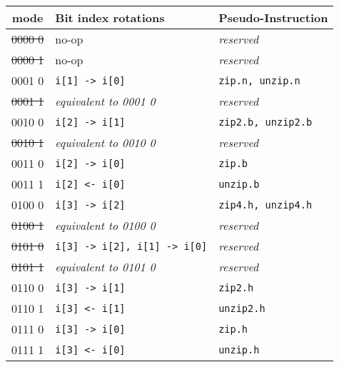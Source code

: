 \begin{table}[h]
\begin{small}
\begin{center}
\begin{tabular}{c l l}
      mode    & Bit index rotations              & Pseudo-Instruction     \\

\hline

\sout{0000 0} & no-op                            & {\it reserved}         \\
\sout{0000 1} & no-op                            & {\it reserved}         \\
      0001 0  & {\tt i[1] -> i[0]}               & {\tt zip.n, unzip.n}   \\
\sout{0001 1} & {\it equivalent to 0001 0}       & {\it reserved}         \\
      0010 0  & {\tt i[2] -> i[1]}               & {\tt zip2.b, unzip2.b} \\
\sout{0010 1} & {\it equivalent to 0010 0}       & {\it reserved}         \\
      0011 0  & {\tt i[2] -> i[0]}               & {\tt zip.b}            \\
      0011 1  & {\tt i[2] <- i[0]}               & {\tt unzip.b}          \\

\hline

      0100 0  & {\tt i[3] -> i[2]}               & {\tt zip4.h, unzip4.h} \\
\sout{0100 1} & {\it equivalent to 0100 0}       & {\it reserved}         \\
\sout{0101 0} & {\tt i[3] -> i[2], i[1] -> i[0]} & {\it reserved}         \\
\sout{0101 1} & {\it equivalent to 0101 0}       & {\it reserved}         \\
      0110 0  & {\tt i[3] -> i[1]}               & {\tt zip2.h}           \\
      0110 1  & {\tt i[3] <- i[1]}               & {\tt unzip2.h}         \\
      0111 0  & {\tt i[3] -> i[0]}               & {\tt zip.h}            \\
      0111 1  & {\tt i[3] <- i[0]}               & {\tt unzip.h}          \\

\hline


\end{tabular}
\end{center}
\end{small}
\end{table}
